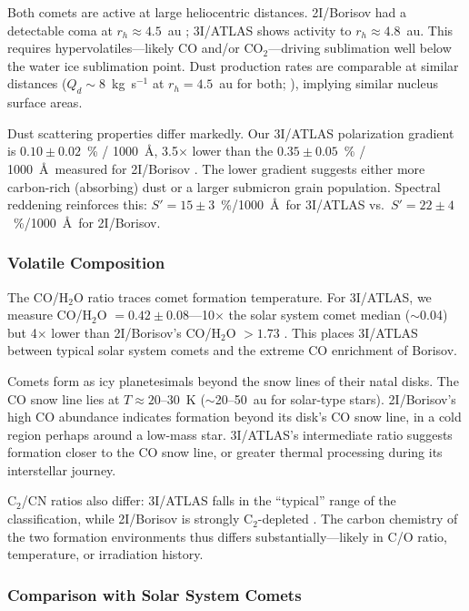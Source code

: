 \documentclass[preprint2]{aastex631}
\begin{document}
Both comets are active at large heliocentric distances. 2I/Borisov had a detectable coma at $r_h \approx 4.5$~au \citep{jewitt19}; 3I/ATLAS shows activity to $r_h \approx 4.8$~au. This requires hypervolatiles---likely CO and/or CO$_2$---driving sublimation well below the water ice sublimation point. Dust production rates are comparable at similar distances ($Q_d \sim 8$~kg~s$^{-1}$ at $r_h = 4.5$~au for both; \citealt{clements21}), implying similar nucleus surface areas.

Dust scattering properties differ markedly. Our 3I/ATLAS polarization gradient is $0.10 \pm 0.02$~\% / 1000~\AA, 3.5$\times$ lower than the $0.35 \pm 0.05$~\% / 1000~\AA\ measured for 2I/Borisov \citep{bagnulo22}. The lower gradient suggests either more carbon-rich (absorbing) dust or a larger submicron grain population. Spectral reddening reinforces this: $S' = 15 \pm 3$~\%/1000~\AA\ for 3I/ATLAS vs.\ $S' = 22 \pm 4$~\%/1000~\AA\ for 2I/Borisov.

\subsubsection{Volatile Composition}

The CO/H$_2$O ratio traces comet formation temperature. For 3I/ATLAS, we measure CO/H$_2$O $= 0.42 \pm 0.08$---10$\times$ the solar system comet median ($\sim$0.04) but 4$\times$ lower than 2I/Borisov's CO/H$_2$O $> 1.73$ \citep{bodewits20}. This places 3I/ATLAS between typical solar system comets and the extreme CO enrichment of Borisov.

Comets form as icy planetesimals beyond the snow lines of their natal disks. The CO snow line lies at $T \approx 20$--30~K ($\sim$20--50~au for solar-type stars). 2I/Borisov's high CO abundance indicates formation beyond its disk's CO snow line, in a cold region perhaps around a low-mass star. 3I/ATLAS's intermediate ratio suggests formation closer to the CO snow line, or greater thermal processing during its interstellar journey.

C$_2$/CN ratios also differ: 3I/ATLAS falls in the ``typical'' range of the \citet{ahearn95} classification, while 2I/Borisov is strongly C$_2$-depleted \citep{opitom20}. The carbon chemistry of the two formation environments thus differs substantially---likely in C/O ratio, temperature, or irradiation history.

\subsubsection{Comparison with Solar System Comets}
\end{document}
